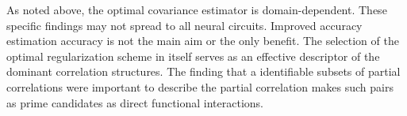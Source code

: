 As noted above, the optimal covariance estimator is domain-dependent. 
These specific findings may not spread to all neural circuits.
Improved accuracy estimation accuracy is not the main aim or the only benefit.  
The selection of the optimal regularization scheme in itself serves as an effective descriptor of the dominant correlation structures. The finding that a identifiable subsets of partial correlations were important to describe the partial correlation makes such pairs as prime candidates as direct functional interactions. 
